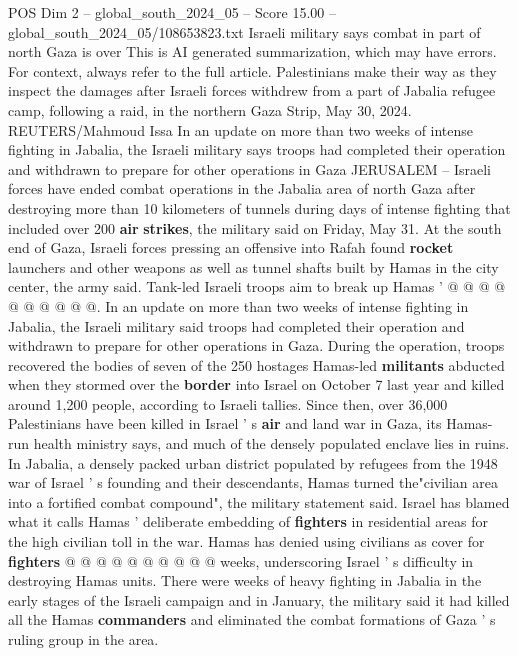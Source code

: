 \begin{textsample}{POS Dim 2 – global\_south\_2024\_05 – Score 15.00 – global\_south\_2024\_05/108653823.txt}  \label{ex:f2_pos_228}
Israeli military says combat in part of north Gaza is over This is AI generated summarization, which may have errors.
For context, always refer to the full article.
Palestinians make their way as they inspect the damages after Israeli forces withdrew from a part of Jabalia refugee camp, following a raid, in the northern Gaza Strip, May 30, 2024.
REUTERS/Mahmoud Issa In an update on more than two weeks of intense fighting in Jabalia, the Israeli military says troops had completed their operation and withdrawn to prepare for other operations in Gaza JERUSALEM -- Israeli forces have ended combat operations in the Jabalia area of north Gaza after destroying more than 10 kilometers of tunnels during days of intense fighting that included over 200 \textbf{air} \textbf{strikes}, the military said on Friday, May 31.
At the south end of Gaza, Israeli forces pressing an offensive into Rafah found \textbf{rocket} launchers and other weapons as well as tunnel shafts built by Hamas in the city center, the army said.
Tank-led Israeli troops aim to break up Hamas ' @ @ @ @ @ @ @ @ @ @.
In an update on more than two weeks of intense fighting in Jabalia, the Israeli military said troops had completed their operation and withdrawn to prepare for other operations in Gaza.
During the operation, troops recovered the bodies of seven of the 250 hostages Hamas-led \textbf{militants} abducted when they stormed over the \textbf{border} into Israel on October 7 last year and killed around 1,200 people, according to Israeli tallies.
Since then, over 36,000 Palestinians have been killed in Israel ' s \textbf{air} and land war in Gaza, its Hamas-run health ministry says, and much of the densely populated enclave lies in ruins.
In Jabalia, a densely packed urban district populated by refugees from the 1948 war of Israel ' s founding and their descendants, Hamas turned the"civilian area into a fortified combat compound", the military statement said.
Israel has blamed what it calls Hamas ' deliberate embedding of \textbf{fighters} in residential areas for the high civilian toll in the war.
Hamas has denied using civilians as cover for \textbf{fighters} @ @ @ @ @ @ @ @ @ @ weeks, underscoring Israel ' s difficulty in destroying Hamas units.
There were weeks of heavy fighting in Jabalia in the early stages of the Israeli campaign and in January, the military said it had killed all the Hamas \textbf{commanders} and eliminated the combat formations of Gaza ' s ruling group in the area.

\end{textsample}
